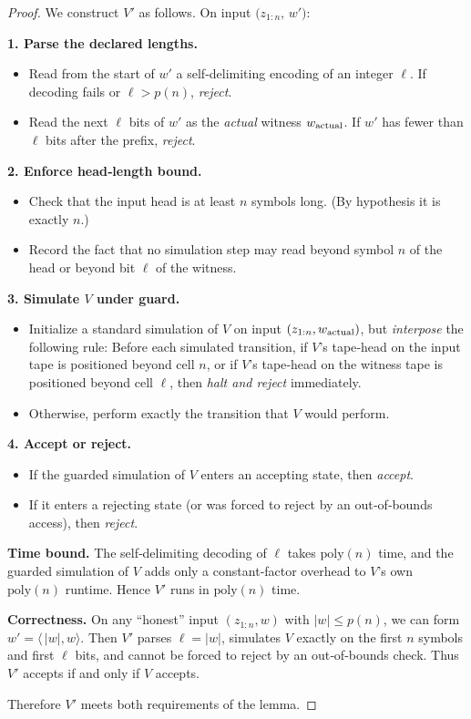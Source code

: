 \documentclass[12pt]{article}
\theoremstyle{definition}
\theoremstyle{plain}
\begin{document}
\begin{proof}
We construct $V'$ as follows.  On input $\bigl(z_{1:n},\,w'\bigr)$:

\medskip\noindent\textbf{1. Parse the declared lengths.}
\begin{itemize}
  \item Read from the start of $w'$ a self‐delimiting encoding of an integer $\ell$.  If decoding fails or $\ell>p(n)$, \emph{reject}.
  \item Read the next $\ell$ bits of $w'$ as the \emph{actual} witness $w_{\rm actual}$.  If $w'$ has fewer than $\ell$ bits after the prefix, \emph{reject}.
\end{itemize}

\medskip\noindent\textbf{2. Enforce head‐length bound.}
\begin{itemize}
  \item Check that the input head is at least $n$ symbols long.  (By hypothesis it is exactly $n$.)  
  \item Record the fact that no simulation step may read beyond symbol $n$ of the head or beyond bit $\ell$ of the witness.
\end{itemize}

\medskip\noindent\textbf{3. Simulate $V$ under guard.}
\begin{itemize}
  \item Initialize a standard simulation of $V$ on input $(z_{1:n},w_{\rm actual})$, but \emph{interpose} the following rule:  
    Before each simulated transition, if $V$’s tape‐head on the input tape is positioned beyond cell $n$, or if $V$’s tape‐head on the witness tape is positioned beyond cell $\ell$, then \emph{halt and reject} immediately.
  \item Otherwise, perform exactly the transition that $V$ would perform.
\end{itemize}

\medskip\noindent\textbf{4. Accept or reject.}
\begin{itemize}
  \item If the guarded simulation of $V$ enters an accepting state, then \emph{accept}.
  \item If it enters a rejecting state (or was forced to reject by an out‐of‐bounds access), then \emph{reject}.
\end{itemize}

\medskip\noindent\textbf{Time bound.}
The self‐delimiting decoding of $\ell$ takes $\mathrm{poly}(n)$ time, and the guarded simulation of $V$ adds only a constant‐factor overhead to $V$’s own $\mathrm{poly}(n)$ runtime.  Hence $V'$ runs in $\mathrm{poly}(n)$ time.

\medskip\noindent\textbf{Correctness.}
On any “honest” input $(z_{1:n},w)$ with $|w|\le p(n)$, we can form $w'=\langle\,|w|,w\rangle$.  Then $V'$ parses $\ell=|w|$, simulates $V$ exactly on the first $n$ symbols and first $\ell$ bits, and cannot be forced to reject by an out‐of‐bounds check.  Thus $V'$ accepts if and only if $V$ accepts.  

Therefore $V'$ meets both requirements of the lemma.
\end{proof}
\end{document}
